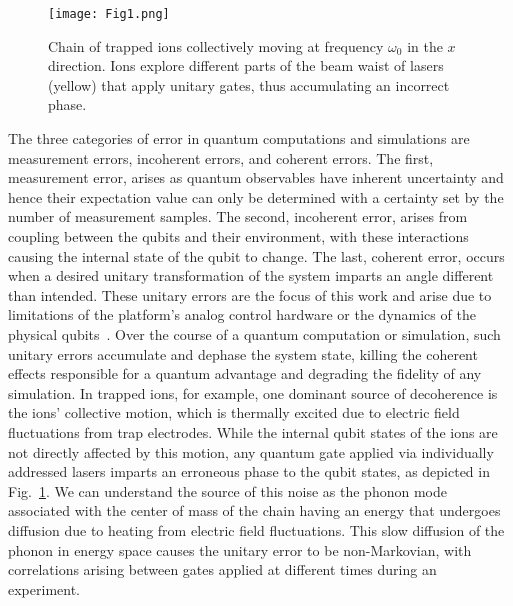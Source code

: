 \documentclass[prx,aps,twocolumn,showpacs,superscriptaddress,10pt]{revtex4-1}
\begin{document}
\begin{figure}[t!]
	\centering
	\texttt{[image: Fig1.png]}
	\caption{Chain of trapped ions collectively moving at frequency $\omega_{0}$ in the $x$ direction. Ions explore different parts of the beam waist of lasers (yellow) that apply unitary gates, thus accumulating an incorrect phase.}
	\label{fig:ionSchematic}
\end{figure}

The three categories of error in quantum computations and simulations are measurement errors, incoherent errors, and coherent errors. The first, measurement error, arises as quantum observables have inherent uncertainty and hence their expectation value can only be determined with a certainty set by the number of measurement samples. The second, incoherent error, arises from coupling between the qubits and their environment, with these interactions causing the internal state of the qubit to change. The last, coherent error, occurs when a desired unitary transformation of the system imparts an angle different than intended. These unitary errors are the focus of this work and arise due to limitations of the platform's analog control hardware or the dynamics of the physical qubits~\cite{Rines2019}. Over the course of a quantum computation or simulation, such unitary errors accumulate and dephase the system state, killing the coherent effects responsible for a quantum advantage and degrading the fidelity of any simulation. In trapped ions, for example, one dominant source of decoherence is the ions' collective motion, which is thermally excited due to electric field fluctuations from trap electrodes. While the internal qubit states of the ions are not directly affected by this motion, any quantum gate applied via individually addressed lasers imparts an erroneous phase to the qubit states, as depicted in Fig.~\ref{fig:ionSchematic}. We can understand the source of this noise as the phonon mode associated with the center of mass of the chain having an energy that undergoes diffusion due to heating from electric field fluctuations. This slow diffusion of the phonon in energy space causes the unitary error to be non-Markovian, with correlations arising between gates applied at different times during an experiment. 

\end{document}
